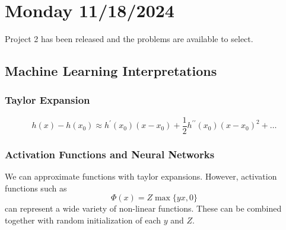 \section{Monday 11/18/2024}
Project 2 has been released and the problems are available to select.
\subsection{Machine Learning Interpretations}
\subsubsection{Taylor Expansion}
\begin{equation}
  h(x) - h(x_0) \approx h^\prime(x_0)(x-x_0) + \frac{1}{2} h^{\prime \prime}(x_0)(x-x_0)^2 + \dots
\end{equation}
\subsubsection{Activation Functions and Neural Networks}
We can approximate functions with taylor expansions. However, activation functions such as
\begin{equation}
  \Phi(x) = Z \max \{ yx,0  \} 
\end{equation}
can represent a wide variety of non-linear functions. These can be combined together with random initialization of each $y$ and $Z$.